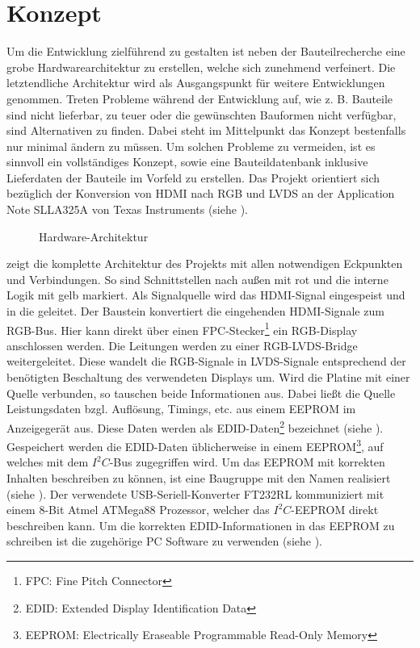 \section{Konzept}
\label{sec:TeilB_Konzept}
Um die Entwicklung zielführend zu gestalten ist neben der Bauteilrecherche eine grobe Hardwarearchitektur zu erstellen, welche sich zunehmend verfeinert. Die letztendliche Architektur wird als Ausgangspunkt für weitere Entwicklungen genommen. Treten Probleme während der Entwicklung auf, wie z. B. Bauteile sind nicht lieferbar, zu teuer oder die gewünschten Bauformen nicht verfügbar, sind Alternativen zu finden. Dabei steht im Mittelpunkt das Konzept bestenfalls nur minimal ändern zu müssen. Um solchen Probleme zu vermeiden, ist es sinnvoll ein vollständiges Konzept, sowie eine Bauteildatenbank inklusive Lieferdaten der Bauteile im Vorfeld zu erstellen. Das Projekt orientiert sich bezüglich der Konversion von HDMI nach RGB und LVDS an der Application Note SLLA325A von Texas Instruments (siehe \cite{TI2011}).
\begin{figure}[htp]
	\centering
{}
	\caption{Hardware-Architektur}
	\label{fig:teilb_architektur}
\end{figure}

 zeigt die komplette Architektur des Projekts mit allen notwendigen Eckpunkten und Verbindungen. So sind Schnittstellen nach außen mit rot und die interne Logik mit gelb markiert. Als Signalquelle wird das HDMI-Signal eingespeist und in die  geleitet. Der Baustein  konvertiert die eingehenden HDMI-Signale zum RGB-Bus. Hier kann direkt über einen FPC-Stecker\footnote{FPC: Fine Pitch Connector} ein RGB-Display anschlossen werden. Die Leitungen werden zu einer RGB-LVDS-Bridge weitergeleitet. Diese wandelt die RGB-Signale in LVDS-Signale entsprechend der benötigten Beschaltung des verwendeten Displays um. Wird die Platine mit einer Quelle verbunden, so tauschen beide Informationen aus. Dabei ließt die Quelle Leistungsdaten bzgl. Auflösung, Timings, etc. aus einem EEPROM  im Anzeigegerät aus. Diese Daten werden als EDID-Daten\footnote{EDID: Extended Display Identification Data} bezeichnet (siehe \cite{edid2000}). Gespeichert werden die EDID-Daten üblicherweise in einem EEPROM\footnote{EEPROM: Electrically Eraseable Programmable Read-Only Memory}, auf welches mit dem $I^2C$-Bus zugegriffen wird. Um das EEPROM mit korrekten Inhalten beschreiben zu können, ist eine Baugruppe mit den Namen  realisiert (siehe ). Der verwendete USB-Seriell-Konverter FT232RL kommuniziert mit einem 8-Bit Atmel ATMega88 Prozessor, welcher das $I^2C$-EEPROM direkt beschreiben kann. Um die korrekten EDID-Informationen in das EEPROM zu schreiben ist die zugehörige PC Software zu verwenden (siehe ).\newpage